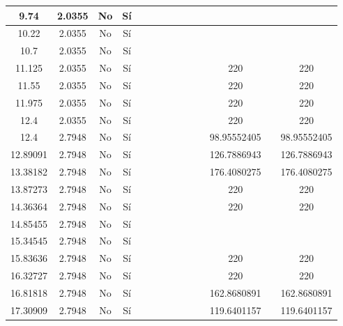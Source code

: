 \begin{table}[H]
{\begin{tabular}{|c|c|c|c|c|c|c|c|c|c|c|c|c|c|}
\hline
9.74 & 2.0355 & No  & Sí  &     &     &     &     &     &     &     &     &     &  \bigstrut\\
\hline
10.22 & 2.0355 & No  & Sí  &     &     &     &     &     &     &     &     &     &  \bigstrut\\
\hline
10.7 & 2.0355 & No  & Sí  &     &     &     &     &     &     &     &     &     &  \bigstrut\\
\hline
11.125 & 2.0355 & No  & Sí  &     &     &     &     &     &     &     & 220 &     & 220 \bigstrut\\
\hline
11.55 & 2.0355 & No  & Sí  &     &     &     &     &     &     &     & 220 &     & 220 \bigstrut\\
\hline
11.975 & 2.0355 & No  & Sí  &     &     &     &     &     &     &     & 220 &     & 220 \bigstrut\\
\hline
12.4 & 2.0355 & No  & Sí  &     &     &     &     &     &     &     & 220 &     & 220 \bigstrut\\
\hline
12.4 & 2.7948 & No  & Sí  &     &     &     &     &     &     &     & 98.95552405 &     & 98.95552405 \bigstrut\\
\hline
12.89091 & 2.7948 & No  & Sí  &     &     &     &     &     &     &     & 126.7886943 &     & 126.7886943 \bigstrut\\
\hline
13.38182 & 2.7948 & No  & Sí  &     &     &     &     &     &     &     & 176.4080275 &     & 176.4080275 \bigstrut\\
\hline
13.87273 & 2.7948 & No  & Sí  &     &     &     &     &     &     &     & 220 &     & 220 \bigstrut\\
\hline
14.36364 & 2.7948 & No  & Sí  &     &     &     &     &     &     &     & 220 &     & 220 \bigstrut\\
\hline
14.85455 & 2.7948 & No  & Sí  &     &     &     &     &     &     &     &     &     &  \bigstrut\\
\hline
15.34545 & 2.7948 & No  & Sí  &     &     &     &     &     &     &     &     &     &  \bigstrut\\
\hline
15.83636 & 2.7948 & No  & Sí  &     &     &     &     &     &     &     & 220 &     & 220 \bigstrut\\
\hline
16.32727 & 2.7948 & No  & Sí  &     &     &     &     &     &     &     & 220 &     & 220 \bigstrut\\
\hline
16.81818 & 2.7948 & No  & Sí  &     &     &     &     &     &     &     & 162.8680891 &     & 162.8680891 \bigstrut\\
\hline
17.30909 & 2.7948 & No  & Sí  &     &     &     &     &     &     &     & 119.6401157 &     & 119.6401157 \bigstrut\\

\end{tabular}}
\end{table}
